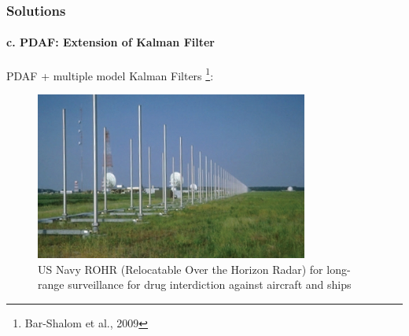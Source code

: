 %
%
%
%
%
%
%
%



\begin{frame}
\frametitle{Solutions}
\framesubtitle{c. PDAF: Extension of Kalman Filter}
\mypagenum
	PDAF + multiple model Kalman Filters \tiny{\footnote{Bar-Shalom et al., 2009}}:
	\begin{figure}
		\includegraphics[width=0.8\textwidth]{figs/TRK_PDAF_example_US_Navy_ROTHR.jpg}
		\caption {US Navy ROHR (Relocatable Over the Horizon Radar) for long-range surveillance for drug interdiction against aircraft and ships}
	\end{figure}
\end{frame}

